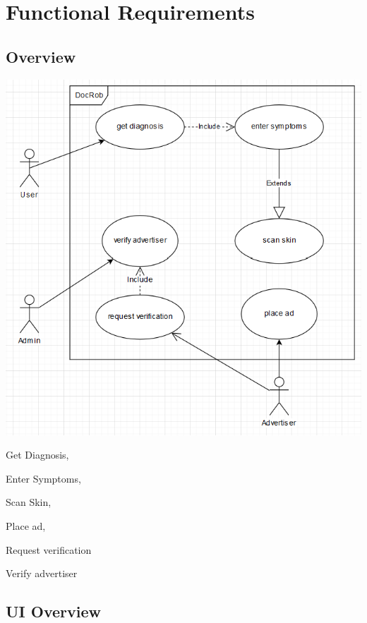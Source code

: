 \documentclass[12pt]{article}
\theoremstyle{definition}
\begin{document}
\pagebreak

\section{Functional Requirements}

\subsection{Overview}

\includegraphics[scale=1.69420]{SystemSpec/Usecases/Diagrams/UseCaseDiagram.png}\\

\begin{enumerate*}
    \item Get Diagnosis,
    \item Enter Symptoms,
    \item Scan Skin,
    \item Place ad,
    \item Request verification
    \item Verify advertiser
\end{enumerate*}

\subsection{UI Overview}
\end{document}
